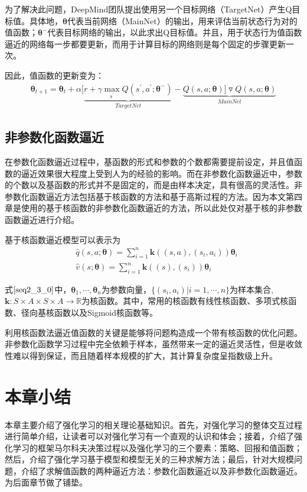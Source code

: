 为了解决此问题，DeepMind团队提出使用另一个目标网络（TargetNet）产生Q目标值。具体地，$\bm{\theta}$代表当前网络（MainNet）的输出，用来评估当前状态行为对的值函数；$\bm{\theta}^{-}$代表目标网络的输出，以此求出Q目标值。并且，用于状态行为值函数逼近的网络每一步都要更新，而用于计算目标的网络则是每个固定的步骤更新一次。

因此，值函数的更新变为：
\begin{equation}
\begin{aligned}
\bm{\theta}_{t+1}=\bm{\theta}_{t}+\alpha[\underbrace{r+\gamma \max_{s^{'}}Q(s^{'},a^{'};\bm{\theta}^{-})}_{TargetNet}-\underbrace{Q(s,a;\bm{\theta})]\triangledown Q(s,a;\bm{\theta})}_{MainNet}
\end{aligned}
\end{equation}

\subsection{非参数化函数逼近}
在参数化函数逼近过程中，基函数的形式和参数的个数都需要提前设定，并且值函数的逼近效果很大程度上受到人为的经验的影响。而在非参数化函数逼近中，参数的个数以及基函数的形式并不是固定的，而是由样本决定，具有很高的灵活性。非参数化函数逼近方法包括基于核函数的方法和基于高斯过程的方法。因为本文第四章是使用的基于核函数的非参数化函数逼近的方法，所以此处仅对基于核的非参数函数逼近进行介绍。

基于核函数逼近模型可以表示为
\begin{equation}\label{seq2_3_0}
\begin{aligned}
&\hat{q}(s,a;\bm{\theta})=\sum^{n}_{i=1}\bm{k}((s,a),(s_{i},a_{i}))\bm{\theta}_{i}\\
&\hat{v}(s;\bm{\theta})=\sum^{n}_{i=1}\bm{k}((s),(s_{i}))\bm{\theta}_{i}
\end{aligned}
\end{equation}

式$\eqref{seq2_3_0}$中，$\bm{\theta}_{1},\cdots,\bm{\theta}_{n}$为参数向量，$\{(s_{i},a_{i})|i=1,\cdots,n\}$为样本集合,$\bm{k}:S\times A \times S \times A \to \mathbb{R} $为核函数。其中，常用的核函数有线性核函数、多项式核函数、径向基核函数以及Sigmoid核函数等。

利用核函数法逼近值函数的关键是能够将问题构造成一个带有核函数的优化问题。非参数化函数学习过程中完全依赖于样本，虽然带来一定的逼近灵活性，但是收敛性难以得到保证，而且随着样本规模的扩大，其计算复杂度呈指数级上升。

\section{本章小结}
 本章主要介绍了强化学习的相关理论基础知识。首先，对强化学习的整体交互过程进行简单介绍，让读者可以对强化学习有一个直观的认识和体会；接着，介绍了强化学习的框架马尔科夫决策过程以及强化学习的三个要素：策略、回报和值函数；然后，介绍了强化学习基于模型和模型无关的三种求解方法；最后，针对大规模问题，介绍了求解值函数的两种逼近方法：参数化函数逼近以及非参数化函数逼近。为后面章节做了铺垫。